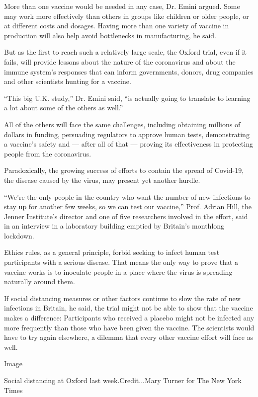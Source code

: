 More than one vaccine would be needed in any case, Dr. Emini argued.
Some may work more effectively than others in groups like children or
older people, or at different costs and dosages. Having more than one
variety of vaccine in production will also help avoid bottlenecks in
manufacturing, he said.

But as the first to reach such a relatively large scale, the Oxford
trial, even if it fails, will provide lessons about the nature of the
coronavirus and about the immune system's responses that can inform
governments, donors, drug companies and other scientists hunting for a
vaccine.

``This big U.K. study,'' Dr. Emini said, ``is actually going to
translate to learning a lot about some of the others as well.''

All of the others will face the same challenges, including obtaining
millions of dollars in funding, persuading regulators to approve human
tests, demonstrating a vaccine's safety and --- after all of that ---
proving its effectiveness in protecting people from the coronavirus.

Paradoxically, the growing success of efforts to contain the spread of
Covid-19, the disease caused by the virus, may present yet another
hurdle.

``We're the only people in the country who want the number of new
infections to stay up for another few weeks, so we can test our
vaccine,'' Prof. Adrian Hill, the Jenner Institute's director and one of
five researchers involved in the effort, said in an interview in a
laboratory building emptied by Britain's monthlong lockdown.

Ethics rules, as a general principle, forbid seeking to infect human
test participants with a serious disease. That means the only way to
prove that a vaccine works is to inoculate people in a place where the
virus is spreading naturally around them.

If social distancing measures or other factors continue to slow the rate
of new infections in Britain, he said, the trial might not be able to
show that the vaccine makes a difference: Participants who received a
placebo might not be infected any more frequently than those who have
been given the vaccine. The scientists would have to try again
elsewhere, a dilemma that every other vaccine effort will face as well.

Image

Social distancing at Oxford last week.Credit...Mary Turner for The New
York Times

